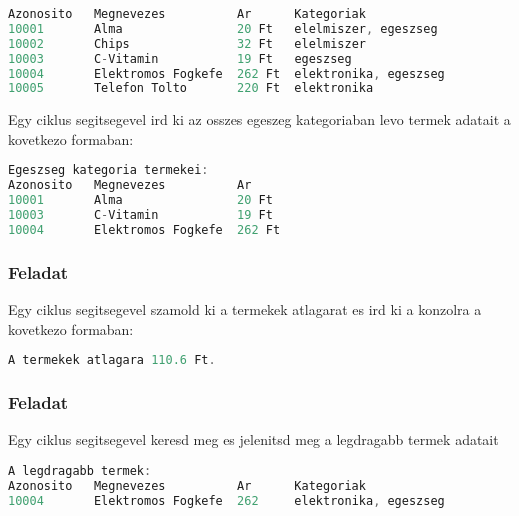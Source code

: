 \documentclass{article}
\begin{document}
\begin{lstlisting}[language=Java, caption=Feladat]
Azonosito   Megnevezes          Ar      Kategoriak
10001       Alma                20 Ft   elelmiszer, egeszseg
10002       Chips               32 Ft   elelmiszer
10003       C-Vitamin           19 Ft   egeszseg
10004       Elektromos Fogkefe  262 Ft  elektronika, egeszseg
10005       Telefon Tolto       220 Ft  elektronika
\end{lstlisting}

Egy ciklus segitsegevel ird ki az osszes egeszeg kategoriaban levo termek adatait a kovetkezo formaban:

\begin{lstlisting}[language=Java, caption=Feladat]
Egeszseg kategoria termekei:
Azonosito   Megnevezes          Ar
10001       Alma                20 Ft
10003       C-Vitamin           19 Ft
10004       Elektromos Fogkefe  262 Ft
\end{lstlisting}

\subsubsection{Feladat}

Egy ciklus segitsegevel szamold ki a termekek atlagarat es ird ki a konzolra a kovetkezo formaban:

\begin{lstlisting}[language=Java, caption=Feladat]
A termekek atlagara 110.6 Ft.
\end{lstlisting}

\subsubsection{Feladat}

Egy ciklus segitsegevel keresd meg es jelenitsd meg a legdragabb termek adatait

\begin{lstlisting}[language=Java, caption=Feladat]
A legdragabb termek:
Azonosito   Megnevezes          Ar      Kategoriak
10004       Elektromos Fogkefe  262     elektronika, egeszseg
\end{lstlisting}
\end{document}
